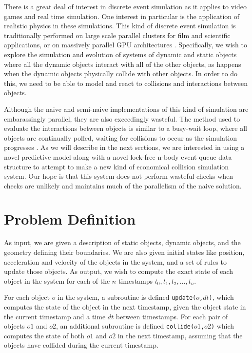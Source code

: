 \documentclass[conference]{IEEEtran}
\begin{document}
There is a great deal of interest in discrete event simulation as it applies to video games and real time simulation. One interest in particular is the application of realistic physics in these simulations.  This kind of discrete event simulation is traditionally performed on large scale parallel clusters for film and scientific applications, or on massively parallel GPU architectures \cite{grape,uberflow}.  Specifically, we wish to explore the simulation and evolution of systems of dynamic and static objects where all the dynamic objects interact with all of the other objects, as happens when the dynamic objects physically collide with other objects.  In order to do this, we need to be able to model and react to collisions and interactions between objects. 

Although the naive and semi-naive implementations of this kind of simulation are embarassingly parallel, they are also exceedingly wasteful.  The method used to evaluate the interactions between objects is similar to a busy-wait loop, where all objects are continually polled, waiting for collisions to occur as the simulation progresses \cite{nbodycollisions,Moore88collisiondetection}.   As we will describe in the next sections, we are interested in using a novel predictive model along with a novel lock-free n-body event queue data structure to attempt to make a new kind of economical collision simulation system.  Our hope is that this system does not perform wasteful checks when checks are unlikely and maintains much of the parallelism of the naive solution.

\section{Problem Definition}

As input, we are given a description of static objects, dynamic objects, and the geometry defining their boundaries.  We are also given initial states like position, acceleration and velocity of the objects in the system, and a set of rules to update those objects.  As output, we wish to compute the exact state of each object in the system for each of the $n$ timestamps $t_0, t_1, t_2, \ldots, t_n$.

For each object $o$ in the system, a subroutine is defined \texttt{update($o$,$dt$)}, which computes the state of the object in the next timestamp, given the object state in the current timestamp and a time $dt$ between timestamps.  For each pair of objects $o1$ and $o2$, an additional subroutine is defined \texttt{collide($o1$,$o2$)} which computes the state of both $o1$ and $o2$ in the next timestamp, assuming that the objects have collided during the current timestamp.
\end{document}
